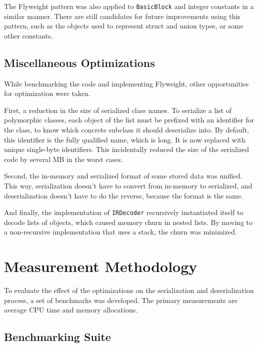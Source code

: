 \documentclass[lettersize,journal]{IEEEtran}
\begin{document}
    The Flyweight pattern was also applied to \texttt{BasicBlock} and integer constants in a similar manner.
    There are still candidates for future improvements using this pattern, such as the objects used to represent struct
    and union types, or some other constants.

    \subsection{Miscellaneous Optimizations}\label{subsec:miscellaneous-optimizations}

    While benchmarking the code and implementing Flyweight, other opportunities for optimization were taken.

    First, a reduction in the size of serialized class names.
    To serialize a list of polymorphic classes, each object of the list must be prefixed with an identifier for the
    class, to know which concrete subclass it should deserialize into.
    By default, this identifier is the fully qualified name, which is long.
    It is now replaced with unique single-byte identifiers.
    This incidentally reduced the size of the serialized code by several MB in the worst cases.

    Second, the in-memory and serialized format of some stored data was unified.
    This way, serialization doesn't have to convert from in-memory to serialized, and deserialization doesn't have to do
    the reverse, because the format is the same.

    And finally, the implementation of \texttt{IRDecoder} recursively instantiated itself to decode lists of objects,
    which caused memory churn in nested lists.
    By moving to a non-recursive implementation that uses a stack, the churn was minimized.

    \section{Measurement Methodology}\label{sec:methodology}

    To evaluate the effect of the optimizations on the serialization and deserialization process, a set of
    benchmarks was developed.
    The primary measurements are average CPU time and memory allocations.

    \subsection{Benchmarking Suite}\label{subsec:benchmarking-suite}
\end{document}
